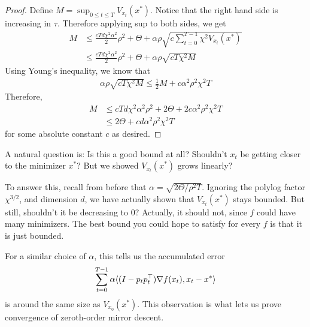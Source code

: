 \begin{proof}
    Define $M = \sup_{0 \leq t \leq T} V_{x_t}(x^*)$. Notice that the right hand side is increasing in $\tau$. Therefore applying sup to both sides, we get
    \begin{align*}
        M &\leq \frac{cT d \chi^{2} \alpha^2}{2} \rho^2 + \Theta + \alpha \rho \sqrt{c \sum_{t=0}^{T-1} \chi^{2} V_{x_t}(x^*)} \\
        &\leq \frac{cT d \chi^{2} \alpha^2}{2} \rho^2 + \Theta + \alpha \rho \sqrt{c T \chi^{2} M}
    \end{align*}
    Using Young's inequality, we know that
    \begin{align*}
        \alpha \rho \sqrt{cT\chi^{2} M} \leq \frac 12 M + c\alpha^2 \rho^2 \chi^{2} T 
    \end{align*}
    Therefore,
    \begin{align*}
        M &\leq cTd \chi^{2} \alpha^2 \rho^2 + 2\Theta + 2c\alpha^2 \rho^2 \chi^{2} T \\
        &\leq 2\Theta + cd\alpha^2 \rho^2 \chi^{2} T
    \end{align*}
    for some absolute constant $c$ as desired.
\end{proof}
A natural question is: Is this a good bound at all? Shouldn't $x_t$ be getting closer to the minimizer $x^*$? But we showed $V_{x_t}(x^*)$ grows linearly? 

To answer this, recall from before that $\alpha = \sqrt{2\Theta / \rho^2 T}$. Ignoring the polylog factor $\chi^{3/2}$, and dimension $d$, we have actually shown that $V_{x_t}(x^*)$ stays bounded. But still, shouldn't it be decreasing to 0? Actually, it should not, since $f$ could have many minimizers. The best bound you could hope to satisfy for every $f$ is that it is just bounded. 

For a similar choice of $\alpha$, this tells us the accumulated error 
\begin{align*}
    \sum_{t=0}^{T-1} \alpha \langle (I-p_tp_t^\top) \nabla f(x_t), x_t-x^* \rangle
\end{align*}
is around the same size as $V_{x_0}(x^*)$. This observation is what lets us prove convergence of zeroth-order mirror descent.

